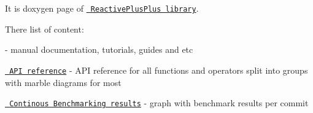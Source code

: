 \label{index_md_docs_Readme}%
%
 It is doxygen page of \href{https://github.com/victimsnino/ReactivePlusPlus}{\texttt{ Reactive\+Plus\+Plus library}}.

There list of content\+:


\begin{DoxyItemize}
\item {} -\/ manual documentation, tutorials, guides and etc
\item \href{https://victimsnino.github.io/ReactivePlusPlus/docs/html/modules.html}{\texttt{ API reference}} -\/ API reference for all functions and operators split into groups with marble diagrams for most
\item \href{https://victimsnino.github.io/ReactivePlusPlus/benchmark}{\texttt{ Continous Benchmarking results}} -\/ graph with benchmark results per commit 
\end{DoxyItemize}